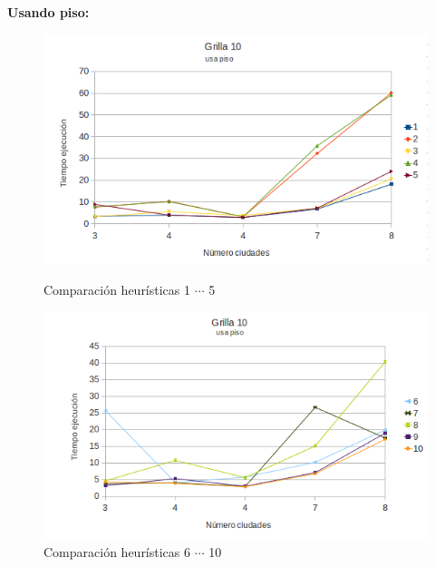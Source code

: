 \documentclass[10pt]{article}
\begin{document}
\newpage

\textbf{Usando piso:}

\begin{figure}[ht]

\begin{minipage}[b]{0.45\linewidth}
 \centering
 \includegraphics[width=\textwidth]{grilla10floor0.png}
 \caption{Comparación heurísticas  1 $\cdots$ 5}
 \label{fig:grid10floor0}
\end{minipage}
\hspace{0.5cm}
\begin{minipage}[b]{0.45\linewidth}
 \centering
 \includegraphics[width=\textwidth]{grilla10floor1.png}
 \caption{Comparación heurísticas  6 $\cdots$ 10}
 \label{fig:grid10floor1}
\end{minipage}


\end{figure}
\end{document}
